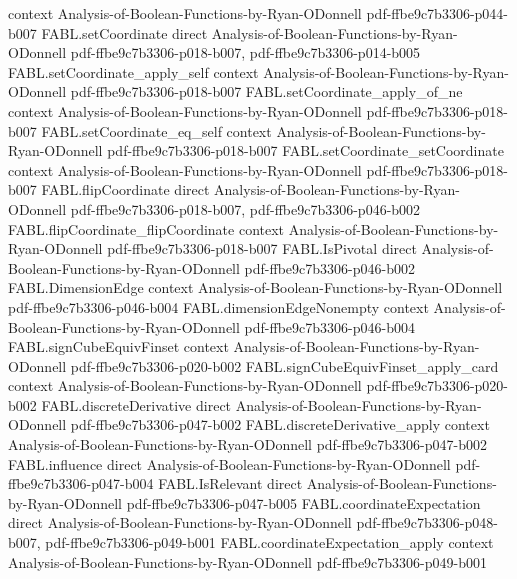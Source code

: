 \begin{theorem}
  {context}
  {Analysis-of-Boolean-Functions-by-Ryan-ODonnell}
  {pdf-ffbe9c7b3306-p044-b007}
\proofstep
  {FABL.setCoordinate}
  {direct}
  {Analysis-of-Boolean-Functions-by-Ryan-ODonnell}
  {pdf-ffbe9c7b3306-p018-b007,
    pdf-ffbe9c7b3306-p014-b005}
\proofstep
  {FABL.setCoordinate_apply_self}
  {context}
  {Analysis-of-Boolean-Functions-by-Ryan-ODonnell}
  {pdf-ffbe9c7b3306-p018-b007}
\proofstep
  {FABL.setCoordinate_apply_of_ne}
  {context}
  {Analysis-of-Boolean-Functions-by-Ryan-ODonnell}
  {pdf-ffbe9c7b3306-p018-b007}
\proofstep
  {FABL.setCoordinate_eq_self}
  {context}
  {Analysis-of-Boolean-Functions-by-Ryan-ODonnell}
  {pdf-ffbe9c7b3306-p018-b007}
\proofstep
  {FABL.setCoordinate_setCoordinate}
  {context}
  {Analysis-of-Boolean-Functions-by-Ryan-ODonnell}
  {pdf-ffbe9c7b3306-p018-b007}
\proofstep
  {FABL.flipCoordinate}
  {direct}
  {Analysis-of-Boolean-Functions-by-Ryan-ODonnell}
  {pdf-ffbe9c7b3306-p018-b007,
    pdf-ffbe9c7b3306-p046-b002}
\proofstep
  {FABL.flipCoordinate_flipCoordinate}
  {context}
  {Analysis-of-Boolean-Functions-by-Ryan-ODonnell}
  {pdf-ffbe9c7b3306-p018-b007}
\proofstep
  {FABL.IsPivotal}
  {direct}
  {Analysis-of-Boolean-Functions-by-Ryan-ODonnell}
  {pdf-ffbe9c7b3306-p046-b002}
\proofstep
  {FABL.DimensionEdge}
  {context}
  {Analysis-of-Boolean-Functions-by-Ryan-ODonnell}
  {pdf-ffbe9c7b3306-p046-b004}
\proofstep
  {FABL.dimensionEdgeNonempty}
  {context}
  {Analysis-of-Boolean-Functions-by-Ryan-ODonnell}
  {pdf-ffbe9c7b3306-p046-b004}
\proofstep
  {FABL.signCubeEquivFinset}
  {context}
  {Analysis-of-Boolean-Functions-by-Ryan-ODonnell}
  {pdf-ffbe9c7b3306-p020-b002}
\proofstep
  {FABL.signCubeEquivFinset_apply_card}
  {context}
  {Analysis-of-Boolean-Functions-by-Ryan-ODonnell}
  {pdf-ffbe9c7b3306-p020-b002}
\proofstep
  {FABL.discreteDerivative}
  {direct}
  {Analysis-of-Boolean-Functions-by-Ryan-ODonnell}
  {pdf-ffbe9c7b3306-p047-b002}
\proofstep
  {FABL.discreteDerivative_apply}
  {context}
  {Analysis-of-Boolean-Functions-by-Ryan-ODonnell}
  {pdf-ffbe9c7b3306-p047-b002}
\proofstep
  {FABL.influence}
  {direct}
  {Analysis-of-Boolean-Functions-by-Ryan-ODonnell}
  {pdf-ffbe9c7b3306-p047-b004}
\proofstep
  {FABL.IsRelevant}
  {direct}
  {Analysis-of-Boolean-Functions-by-Ryan-ODonnell}
  {pdf-ffbe9c7b3306-p047-b005}
\proofstep
  {FABL.coordinateExpectation}
  {direct}
  {Analysis-of-Boolean-Functions-by-Ryan-ODonnell}
  {pdf-ffbe9c7b3306-p048-b007,
    pdf-ffbe9c7b3306-p049-b001}
\proofstep
  {FABL.coordinateExpectation_apply}
  {context}
  {Analysis-of-Boolean-Functions-by-Ryan-ODonnell}
  {pdf-ffbe9c7b3306-p049-b001}

\end{theorem}

